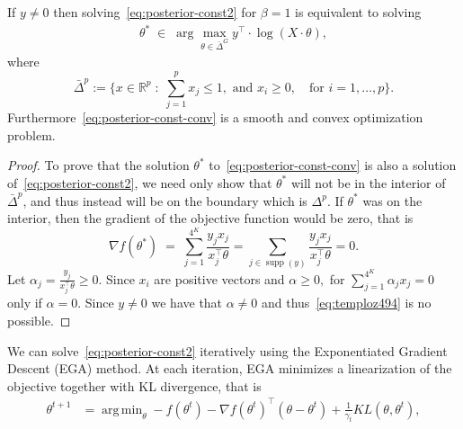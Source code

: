 \documentclass[11pt]{article}
\DeclareMathOperator*{\argmin}{arg\,min}
\DeclareMathOperator*{\supp}{supp}
\DeclareMathOperator*{\cone}{cone}
\begin{document}
\begin{lemma}
If $y \neq 0$
then solving~\eqref{eq:posterior-const2} for $\beta=1$ is equivalent to solving
 \begin{align}
\theta^* \; \in \; \arg \max_{\theta \in\bar{ \Delta}^G}   y^{\top} \cdot \log \left( X \cdot \theta \right)
          \label{eq:posterior-const-conv},
\end{align} 
where   $$\bar{\Delta}^p:= \{  x \in \mathbb{R}^p \; : \; \sum_{j=1}^p x_j \leq 1, \mbox{ and }  x_i \geq 0, \quad \mbox{for } i=1,\ldots, p\}.$$
Furthermore~\eqref{eq:posterior-const-conv} is a smooth and convex optimization problem.
\end{lemma}
 \begin{proof}
To prove that the solution $\theta^*$ to~\eqref{eq:posterior-const-conv} is also a solution of~\eqref{eq:posterior-const2},  we need only show that $\theta^*$ will not be in the interior of $\bar{\Delta}^p$,  and thus instead will be on the boundary which is $\Delta^p.$ If $\theta^*$  was on the interior,  then the gradient of the objective function would be zero,  that is
\begin{equation}\label{eq:temploz494}
\nabla f(\theta^*) \; =\;  \sum_{j=1}^{4^K} \frac{y_j x_j}{x_j^\top \theta}  =  \sum_{j \in \supp(y)} \frac{y_j x_j}{x_j^\top \theta}  =0.
\end{equation}
Let $\alpha_j =  \frac{y_j}{x_j^\top \theta} \geq 0$. 
Since $x_i$ are positive vectors and $\alpha \geq 0, $ for $\sum_{j=1}^{4^K} \alpha _j x_j =0$ only if $\alpha=0.$ Since $y \neq 0$ we have that $\alpha \neq 0$ and thus~\eqref{eq:temploz494} is no possible.
 \end{proof} 
We can solve~\eqref{eq:posterior-const2} iteratively using the Exponentiated Gradient Descent (EGA) method. At each iteration, EGA minimizes a linearization of the objective together with KL divergence, that is
\begin{align}\label{eq:EGA}
\theta^{t+1} & = \argmin_{\theta} -f(\theta^t) - \nabla f(\theta^t)^\top(\theta -\theta^t) + \frac{1}{\gamma_t} KL(\theta,\theta^t),
\end{align}
\end{document}
